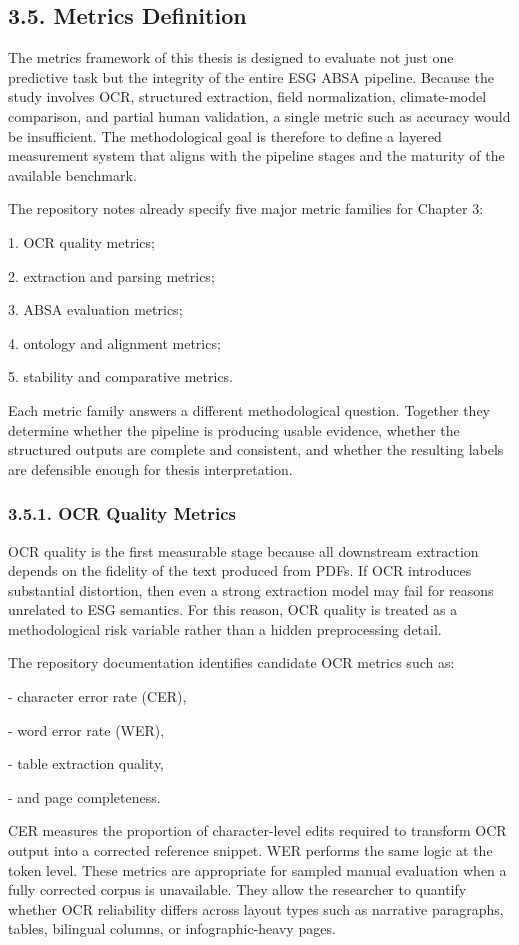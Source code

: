 \documentclass{article}
\begin{document}
\subsection*{ 3.5. Metrics Definition}

The metrics framework of this thesis is designed to evaluate not just one predictive task but the integrity of the entire ESG ABSA pipeline. Because the study involves OCR, structured extraction, field normalization, climate-model comparison, and partial human validation, a single metric such as accuracy would be insufficient. The methodological goal is therefore to define a layered measurement system that aligns with the pipeline stages and the maturity of the available benchmark.

The repository notes already specify five major metric families for Chapter 3:

1. OCR quality metrics;

2. extraction and parsing metrics;

3. ABSA evaluation metrics;

4. ontology and alignment metrics;

5. stability and comparative metrics.

Each metric family answers a different methodological question. Together they determine whether the pipeline is producing usable evidence, whether the structured outputs are complete and consistent, and whether the resulting labels are defensible enough for thesis interpretation.
\subsubsection*{ 3.5.1. OCR Quality Metrics}

OCR quality is the first measurable stage because all downstream extraction depends on the fidelity of the text produced from PDFs. If OCR introduces substantial distortion, then even a strong extraction model may fail for reasons unrelated to ESG semantics. For this reason, OCR quality is treated as a methodological risk variable rather than a hidden preprocessing detail.

The repository documentation identifies candidate OCR metrics such as:

- character error rate (CER),

- word error rate (WER),

- table extraction quality,

- and page completeness.

CER measures the proportion of character-level edits required to transform OCR output into a corrected reference snippet. WER performs the same logic at the token level. These metrics are appropriate for sampled manual evaluation when a fully corrected corpus is unavailable. They allow the researcher to quantify whether OCR reliability differs across layout types such as narrative paragraphs, tables, bilingual columns, or infographic-heavy pages.
\end{document}
